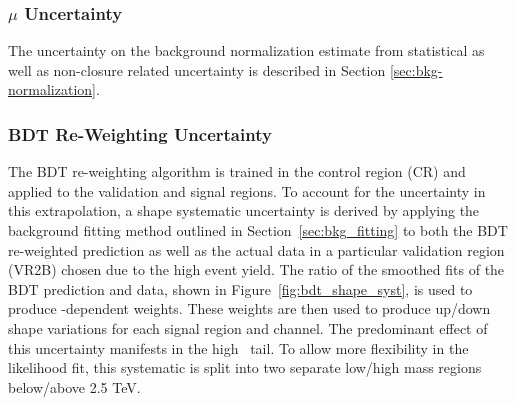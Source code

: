 \subsubsection{$\mu$ Uncertainty}
The uncertainty on the background normalization estimate from statistical as well as non-closure related uncertainty is described in Section \ref{sec:bkg-normalization}.

\subsubsection{BDT Re-Weighting Uncertainty}
The BDT re-weighting algorithm is trained in the control region (CR) and applied to the validation and signal regions.
To account for the uncertainty in this extrapolation, a shape systematic uncertainty is derived by applying the background fitting method outlined in Section~\ref{sec:bkg_fitting} to both the BDT re-weighted prediction as well as the actual data in a particular validation region (VR2B) chosen due to the high event yield.
The ratio of the smoothed fits of the BDT prediction and data, shown in Figure~\ref{fig:bdt_shape_syst}, is used to produce \mvh-dependent weights.
These weights are then used to produce up/down shape variations for each signal region and channel.
The predominant effect of this uncertainty manifests in the high \mvh\ tail.
To allow more flexibility in the likelihood fit, this systematic is split into two separate low/high mass regions below/above 2.5 TeV.

